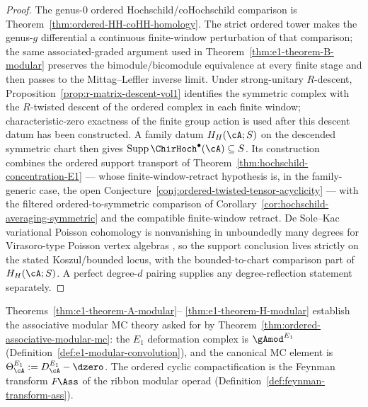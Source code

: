 \begin{proof}
The genus-$0$ ordered Hochschild/coHochschild comparison is
Theorem~\ref{thm:ordered-HH-coHH-homology}. The strict ordered tower
makes the genus-$g$ differential a continuous finite-window
perturbation of that comparison; the same associated-graded argument
used in Theorem~\ref{thm:e1-theorem-B-modular} preserves the
bimodule/bicomodule equivalence at every finite stage and then passes
to the Mittag--Leffler inverse limit. Under strong-unitary
$R$-descent, Proposition~\ref{prop:r-matrix-descent-vol1} identifies
the symmetric complex with the $R$-twisted descent of the ordered
complex in each finite window; characteristic-zero exactness of the
finite group action is used after this descent datum has been
constructed.  A family datum $H_H(\cA;S)$ on the descended symmetric
chart then gives
$\operatorname{Supp}\ChirHoch^\bullet(\cA)\subseteq S$.
Its construction combines the ordered support transport of
Theorem~\ref{thm:hochschild-concentration-E1} --- whose
finite-window-retract hypothesis is, in the family-generic case, the
open Conjecture~\ref{conj:ordered-twisted-tensor-acyclicity} ---
with the filtered ordered-to-symmetric comparison of
Corollary~\ref{cor:hochschild-averaging-symmetric} and the compatible
finite-window retract.  De Sole--Kac variational Poisson cohomology
is nonvanishing in unboundedly many degrees for Virasoro-type Poisson
vertex algebras \cite{BDSK21}, so the support conclusion lives
strictly on the stated Koszul/bounded locus, with the
bounded-to-chart comparison part of $H_H(\cA;S)$.  A perfect
degree-$d$ pairing supplies any
degree-reflection statement separately.
\end{proof}

\begin{remark}
\label{rem:associative-modular-mc-surface}
Theorems~\textup{\ref{thm:e1-theorem-A-modular}}--\textup{%
\ref{thm:e1-theorem-H-modular}} establish the associative modular
MC theory asked for by
Theorem~\textup{\ref{thm:ordered-associative-modular-mc}}: the $E_1$ deformation complex
is ${\gAmod}^{E_1}$
\textup{(}Definition~\textup{\ref{def:e1-modular-convolution}}),
and the canonical MC element is $\Theta_\cA^{E_1} := D_\cA^{E_1}
- \dzero$. The ordered cyclic compactification is the Feynman
transform $F\!\Ass$ of the ribbon modular operad
\textup{(}Definition~\textup{\ref{def:feynman-transform-ass}}).
\end{remark}

